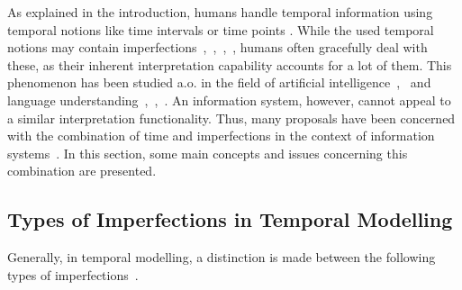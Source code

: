 %
%
As explained in the introduction, humans handle temporal information using temporal notions like time intervals or time points \cite{Dyreson1994}. While the used temporal notions may contain imperfections~\cite{Dev98},~\cite{Dubois:jucs_9_9:fuzziness_and_uncertainty_in},~\cite{nagypal2003},~\cite{Dubois89}, humans often gracefully deal with these, as their inherent interpretation capability accounts for a lot of them. This phenomenon has been studied a.o. in the field of artificial intelligence~\cite{Tre97},~\cite{5151} and language understanding~\cite{DeCaluwe:1997:FTI:285506.285516},~\cite{nagypal2003},~\cite{Dev98}. An information system, however, cannot appeal to a similar interpretation functionality. Thus, many proposals have been concerned with the combination of time and imperfections in the context of information systems~\cite{nagypal2003}. In this section, some main concepts and issues concerning this combination are presented.



\subsection{Types of Imperfections in Temporal Modelling}
Generally, in temporal modelling, a distinction is made between the following types of imperfections~\cite{nagypal2003}.



